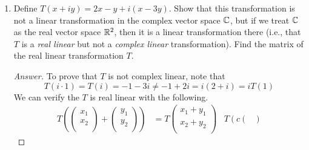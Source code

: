 \documentclass[../psets.tex]{subfiles}
\begin{document}
\begin{enumerate}[label={\textbf{3.\arabic*.}}]
\begin{enumerate}
\begin{proof}[Answer]
\begin{align*}
\begin{pmatrix}
                    \end{pmatrix}
            \end{align*}
            so $T$ is linear. The matrix of $T$ is
            \begin{equation*}
                \begin{pmatrix}
                    a & -b\\
                    b & a\\
                \end{pmatrix}
            \end{equation*}
        \end{proof}
        \item Define $T(x+iy)=2x-y+i(x-3y)$. Show that this transformation is not a linear transformation in the complex vector space $\mathbb{C}$, but if we treat $\mathbb{C}$ as the real vector space $\mathbb{R}^2$, then it is a linear transformation there (i.e., that $T$ is a \emph{real linear} but not a \emph{complex linear} transformation). Find the matrix of the real linear transformation $T$.
        \begin{proof}[Answer]
            To prove that $T$ is not complex linear, note that
            \begin{equation*}
                T(i\cdot 1) = T(i) = -1-3i \neq -1+2i = i(2+i) = iT(1)
            \end{equation*}
            We can verify the $T$ is real linear with the following.
            \begin{align*}
                T\left( 
                    \begin{pmatrix}
                        x_1\\
                        x_2\\
                    \end{pmatrix}
                    +
                    \begin{pmatrix}
                        y_1\\
                        y_2\\
                    \end{pmatrix}
                \right) &= T
                \begin{pmatrix}
                    x_1+y_1\\
                    x_2+y_2\\
                \end{pmatrix}&
                    T\left( c
                        \begin{pmatrix}

\end{pmatrix}
\end{align*}
\end{proof}
\end{enumerate}
\end{enumerate}
\end{document}
